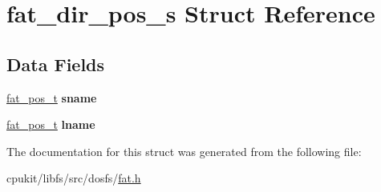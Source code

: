 \hypertarget{structfat__dir__pos__s}{}\section{fat\+\_\+dir\+\_\+pos\+\_\+s Struct Reference}
\label{structfat__dir__pos__s}
\subsection*{Data Fields}
\begin{DoxyCompactItemize}
\item 
\mbox{\label{structfat__dir__pos__s_ab8290d3595a13b48953eaa831a726bae}} 
\mbox{\hyperlink{structfat__pos__s}{fat\+\_\+pos\+\_\+t}} {\bfseries sname}
\item 
\mbox{\label{structfat__dir__pos__s_a1600d22d04066da42005875e8357cd04}} 
\mbox{\hyperlink{structfat__pos__s}{fat\+\_\+pos\+\_\+t}} {\bfseries lname}
\end{DoxyCompactItemize}


The documentation for this struct was generated from the following file\+:\begin{DoxyCompactItemize}
\item 
cpukit/libfs/src/dosfs/\mbox{\hyperlink{fat_8h}{fat.\+h}}\end{DoxyCompactItemize}
